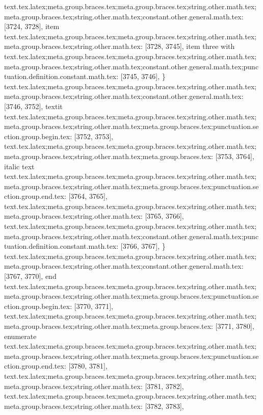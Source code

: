 {{{{{{{{{{{{{{{{{{{{{{{{{{{{{{{{{{{{{{{{{{{{{{{{{{{{{{{{{{{{{{{{{{{{{{{{{{{{{{{{{{{{{{{{{{{{{{{{{{{{{{{{{{{{{{{{{{{{{{text.tex.latex;meta.group.braces.tex;meta.group.braces.tex;string.other.math.tex;meta.group.braces.tex;string.other.math.tex;constant.other.general.math.tex: [3724, 3728], {item}
text.tex.latex;meta.group.braces.tex;meta.group.braces.tex;string.other.math.tex;meta.group.braces.tex;string.other.math.tex: [3728, 3745], { item three with }
text.tex.latex;meta.group.braces.tex;meta.group.braces.tex;string.other.math.tex;meta.group.braces.tex;string.other.math.tex;constant.other.general.math.tex;punctuation.definition.constant.math.tex: [3745, 3746], {\}
text.tex.latex;meta.group.braces.tex;meta.group.braces.tex;string.other.math.tex;meta.group.braces.tex;string.other.math.tex;constant.other.general.math.tex: [3746, 3752], {textit}
text.tex.latex;meta.group.braces.tex;meta.group.braces.tex;string.other.math.tex;meta.group.braces.tex;string.other.math.tex;meta.group.braces.tex;punctuation.section.group.begin.tex: [3752, 3753], {{}
text.tex.latex;meta.group.braces.tex;meta.group.braces.tex;string.other.math.tex;meta.group.braces.tex;string.other.math.tex;meta.group.braces.tex: [3753, 3764], {italic text}
text.tex.latex;meta.group.braces.tex;meta.group.braces.tex;string.other.math.tex;meta.group.braces.tex;string.other.math.tex;meta.group.braces.tex;punctuation.section.group.end.tex: [3764, 3765], {}}
text.tex.latex;meta.group.braces.tex;meta.group.braces.tex;string.other.math.tex;meta.group.braces.tex;string.other.math.tex: [3765, 3766], {
}
text.tex.latex;meta.group.braces.tex;meta.group.braces.tex;string.other.math.tex;meta.group.braces.tex;string.other.math.tex;constant.other.general.math.tex;punctuation.definition.constant.math.tex: [3766, 3767], {\}
text.tex.latex;meta.group.braces.tex;meta.group.braces.tex;string.other.math.tex;meta.group.braces.tex;string.other.math.tex;constant.other.general.math.tex: [3767, 3770], {end}
text.tex.latex;meta.group.braces.tex;meta.group.braces.tex;string.other.math.tex;meta.group.braces.tex;string.other.math.tex;meta.group.braces.tex;punctuation.section.group.begin.tex: [3770, 3771], {{}
text.tex.latex;meta.group.braces.tex;meta.group.braces.tex;string.other.math.tex;meta.group.braces.tex;string.other.math.tex;meta.group.braces.tex: [3771, 3780], {enumerate}
text.tex.latex;meta.group.braces.tex;meta.group.braces.tex;string.other.math.tex;meta.group.braces.tex;string.other.math.tex;meta.group.braces.tex;punctuation.section.group.end.tex: [3780, 3781], {}}
text.tex.latex;meta.group.braces.tex;meta.group.braces.tex;string.other.math.tex;meta.group.braces.tex;string.other.math.tex: [3781, 3782], {
}
text.tex.latex;meta.group.braces.tex;meta.group.braces.tex;string.other.math.tex;meta.group.braces.tex;string.other.math.tex: [3782, 3783], {
}}}}}}}}}}}}}}}}}}}}}}}}}}}}}}}}}}}}}}}}}}}}}}}}}}}}}}}}}}}}}}}}}}}}}}}}}}}}}}}}}}}}}}}}}}}}}}}}}}}}}}}}}}}}}}}}}}}}}}}}}
